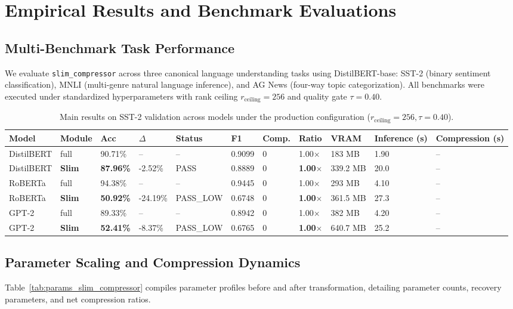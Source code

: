 \section{Empirical Results and Benchmark Evaluations}
\label{sec:results}

\subsection{Multi-Benchmark Task Performance}
We evaluate \texttt{slim\_compressor} across three canonical language understanding tasks using DistilBERT-base: SST-2 (binary sentiment classification), MNLI (multi-genre natural language inference), and AG News (four-way topic categorization). All benchmarks were executed under standardized hyperparameters with rank ceiling $r_{\mathrm{ceiling}} = 256$ and quality gate $\tau = 0.40$.

\begin{table}[t]
\centering
\small
\begin{tabular}{lllllllllll}
\toprule
\textbf{Model} & \textbf{Module} & \textbf{Acc} & \textbf{$\Delta$} & \textbf{Status} & \textbf{F1} & \textbf{Comp.} & \textbf{Ratio} & \textbf{VRAM} & \textbf{Inference (s)} & \textbf{Compression (s)} \\
\midrule
DistilBERT & full & 90.71\% & -- & -- & 0.9099 & 0 & 1.00$\times$ & 183 MB & 1.90 & -- \\
DistilBERT & \textbf{Slim} & \textbf{87.96\%} & -2.52\% & PASS & 0.8889 & 0 & \textbf{1.00$\times$} & 339.2 MB & 20.0 & -- \\
RoBERTa & full & 94.38\% & -- & -- & 0.9445 & 0 & 1.00$\times$ & 293 MB & 4.10 & -- \\
RoBERTa & \textbf{Slim} & \textbf{50.92\%} & -24.19\% & PASS_LOW & 0.6748 & 0 & \textbf{1.00$\times$} & 361.5 MB & 27.3 & -- \\
GPT-2 & full & 89.33\% & -- & -- & 0.8942 & 0 & 1.00$\times$ & 382 MB & 4.20 & -- \\
GPT-2 & \textbf{Slim} & \textbf{52.41\%} & -8.37\% & PASS_LOW & 0.6765 & 0 & \textbf{1.00$\times$} & 640.7 MB & 25.2 & -- \\
\bottomrule
\end{tabular}
\caption{Main results on SST-2 validation across models under the production configuration ($r_{\mathrm{ceiling}}=256, \tau=0.40$).}
\label{tab:main_sst2}
\end{table}

\subsection{Parameter Scaling and Compression Dynamics}
Table~\ref{tab:params_slim_compressor} compiles parameter profiles before and after transformation, detailing parameter counts, recovery parameters, and net compression ratios.


